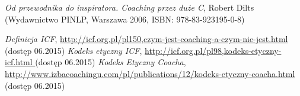 \begin{thebibliography}{99}

 \textit{Od przewodnika do inspiratora. Coaching przez duże C}, Robert Dilts (Wydawnictwo PINLP, Warszawa 2006, ISBN: 978-83-923195-0-8)

 \textit{Definicja ICF}, \url{http://icf.org.pl/pl150,czym-jest-coaching-a-czym-nie-jest.html} (dostęp 06.2015)
 \textit{Kodeks etyczny ICF}, \url{ http://icf.org.pl/pl98,kodeks-etyczny-icf.html } (dostęp 06.2015)
 \textit{Kodeks Etyczny Coacha}, \url{ http://www.izbacoachingu.com/pl/publications/12/kodeks-etyczny-coacha.html } (dostęp 06.2015)
\end{thebibliography}
